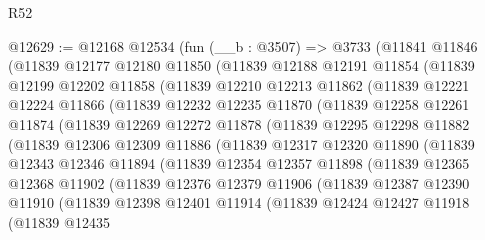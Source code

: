 \begin{lexlean}{R52}
\begin{coremodule}
@12629 := @12168
    @12534
    (fun (__b : @3507) =>
    @3733
      (@11841
        @11846
        (@11839
          @12177
          @12180
          @11850
          (@11839
            @12188
            @12191
            @11854
            (@11839
              @12199
              @12202
              @11858
              (@11839
                @12210
                @12213
                @11862
                (@11839
                  @12221
                  @12224
                  @11866
                  (@11839
                    @12232
                    @12235
                    @11870
                    (@11839
                      @12258
                      @12261
                      @11874
                      (@11839
                        @12269
                        @12272
                        @11878
                        (@11839
                          @12295
                          @12298
                          @11882
                          (@11839
                            @12306
                            @12309
                            @11886
                            (@11839
                              @12317
                              @12320
                              @11890
                              (@11839
                                @12343
                                @12346
                                @11894
                                (@11839
                                  @12354
                                  @12357
                                  @11898
                                  (@11839
                                    @12365
                                    @12368
                                    @11902
                                    (@11839
                                      @12376
                                      @12379
                                      @11906
                                      (@11839
                                        @12387
                                        @12390
                                        @11910
                                        (@11839
                                          @12398
                                          @12401
                                          @11914
                                          (@11839
                                            @12424
                                            @12427
                                            @11918
                                            (@11839
                                              @12435

\end{coremodule}
\end{lexlean}
